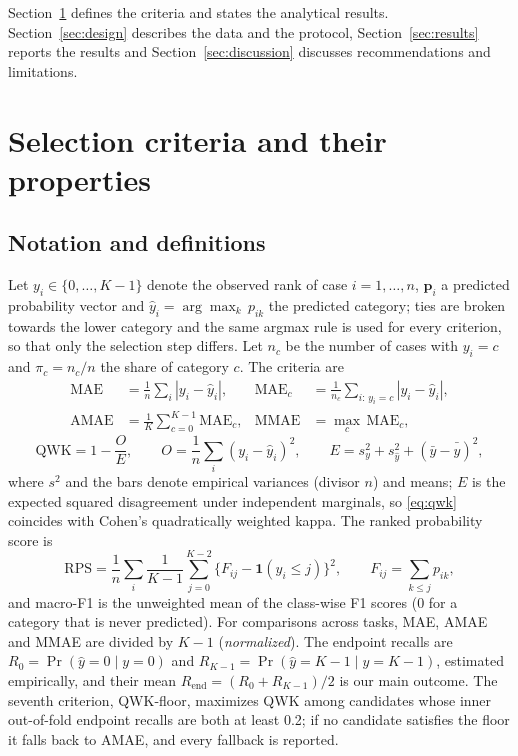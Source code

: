 \documentclass[pdflatex,sn-mathphys-ay]{sn-jnl}
\theoremstyle{thmstyleone}
\theoremstyle{thmstylethree}
\newcommand{\QWKF}{QWK-floor}
\begin{document}
Section~\ref{sec:criteria} defines the criteria and states the analytical results. Section~\ref{sec:design} describes the data and the protocol, Section~\ref{sec:results} reports the results and Section~\ref{sec:discussion} discusses recommendations and limitations.

\section{Selection criteria and their properties}\label{sec:criteria}

\subsection{Notation and definitions}

Let $y_i\in\{0,\dots,K-1\}$ denote the observed rank of case $i=1,\dots,n$, $\mathbf{p}_i$ a predicted probability vector and $\hat y_i=\arg\max_k\, p_{ik}$ the predicted category; ties are broken towards the lower category and the same argmax rule is used for every criterion, so that only the selection step differs. Let $n_c$ be the number of cases with $y_i=c$ and $\pi_c=n_c/n$ the share of category $c$. The criteria are
\begin{align*}
\mathrm{MAE} &= \frac{1}{n}\sum_{i}|y_i-\hat y_i|, &
\mathrm{MAE}_c &= \frac{1}{n_c}\sum_{i:\,y_i=c}|y_i-\hat y_i|,\\
\mathrm{AMAE} &= \frac{1}{K}\sum_{c=0}^{K-1}\mathrm{MAE}_c, &
\mathrm{MMAE} &= \max_{c}\,\mathrm{MAE}_c,
\end{align*}
\begin{equation}\label{eq:qwk}
\mathrm{QWK} = 1-\frac{O}{E},\qquad O=\frac{1}{n}\sum_i (y_i-\hat y_i)^2,\qquad E = s_y^2+s_{\hat y}^2+(\bar y-\bar{\hat y})^2,
\end{equation}
where $s^2$ and the bars denote empirical variances (divisor $n$) and means; $E$ is the expected squared disagreement under independent marginals, so \eqref{eq:qwk} coincides with Cohen's quadratically weighted kappa. The ranked probability score \citep{Epstein1969,Gneiting2007} is
\begin{equation*}
\mathrm{RPS}=\frac{1}{n}\sum_i\frac{1}{K-1}\sum_{j=0}^{K-2}\bigl\{F_{ij}-\mathbf{1}(y_i\le j)\bigr\}^2,\qquad F_{ij}=\sum_{k\le j}p_{ik},
\end{equation*}
and macro-F1 is the unweighted mean of the class-wise F1 scores (0 for a category that is never predicted). For comparisons across tasks, MAE, AMAE and MMAE are divided by $K-1$ (\emph{normalized}). The endpoint recalls are $R_0=\Pr(\hat y=0\mid y=0)$ and $R_{K-1}=\Pr(\hat y=K-1\mid y=K-1)$, estimated empirically, and their mean $R_{\mathrm{end}}=(R_0+R_{K-1})/2$ is our main outcome. The seventh criterion, \QWKF{}, maximizes QWK among candidates whose inner out-of-fold endpoint recalls are both at least 0.2; if no candidate satisfies the floor it falls back to AMAE, and every fallback is reported.
\end{document}
